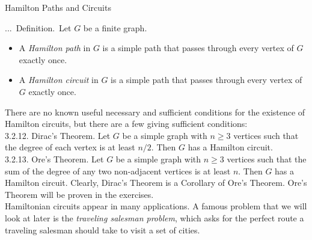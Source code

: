 \documentclass[smaller,hyperref={CJKbookmarks=true}]{beamer}
\newcounter{zhuo}[subsection]
\renewcommand{\thezhuo}{\thesection.\thesubsection.\arabic{zhuo}}
\newenvironment{DEFINITION}{\stepcounter{zhuo}\alert{\thezhuo.~Definition.\,}}{}
\begin{document}
\begin{frame}{Hamilton Paths and Circuits}
\begin{spacing}{1.1}
\vspace*{6pt}
\begin{DEFINITION}
Let $G$ be a finite graph.
\begin{itemize}
  \item[1.] A \emph{Hamilton path} in $G$ is a simple path that passes through every vertex of $G$ exactly once.
  \item[2.] A \emph{Hamilton circuit} in $G$ is a simple path that passes through every vertex of $G$ exactly once.
\end{itemize}
There are no known useful necessary and sufficient conditions for the
existence of Hamilton circuits, but there are a few giving sufficient
conditions:\\[5pt]
\alert{3.2.12. Dirac's Theorem.} Let $G$ be a simple graph with $n\geq 3$ vertices such
that the degree of each vertex is at least $n/2$. Then $G$ has a Hamilton
circuit.\\[5pt]
\alert{3.2.13. Ore's Theorem.} Let $G$ be a simple graph with $n \geq 3$ vertices such that the sum of the degree of any two non-adjacent vertices is at least $n$.
Then $G$ has a Hamilton circuit.
\end{DEFINITION}
\newpage
Clearly, Dirac's Theorem is a Corollary of Ore's Theorem. Ore's Theorem
will be proven in the exercises.\\[6pt]
Hamiltonian circuits appear in many applications. A famous problem that
we will look at later is the \emph{traveling salesman problem}, which asks for the
perfect route a traveling salesman should take to visit a set of cities.
\end{spacing}
\end{frame}
\end{document}

